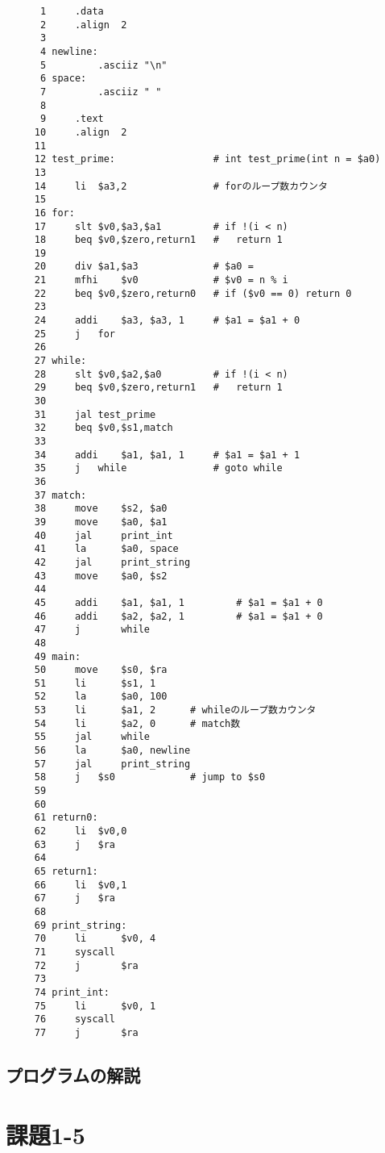 \documentclass[a4j,11pt]{jarticle}
\begin{document}
\begin{verbatim}
      1	    .data
      2	    .align  2
      3	
      4	newline:
      5	        .asciiz "\n"
      6	space:
      7	        .asciiz " "
      8	
      9		.text
     10		.align	2
     11	
     12	test_prime:				    # int test_prime(int n = $a0)
     13	
     14		li	$a3,2			    # forのループ数カウンタ
     15	
     16	for:
     17	    slt	$v0,$a3,$a1	        # if !(i < n)
     18		beq	$v0,$zero,return1	#   return 1
     19	
     20	    div	$a1,$a3			    # $a0 = 
     21		mfhi	$v0			    # $v0 = n % i
     22		beq	$v0,$zero,return0	# if ($v0 == 0) return 0
     23	
     24	    addi	$a3, $a3, 1		# $a1 = $a1 + 0
     25	    j   for
     26	
     27	while:
     28		slt	$v0,$a2,$a0		    # if !(i < n)
     29		beq	$v0,$zero,return1	#   return 1
     30	
     31	    jal test_prime
     32	    beq $v0,$s1,match
     33	
     34	    addi	$a1, $a1, 1		# $a1 = $a1 + 1
     35		j	while			    # goto while
     36	
     37	match: 
     38	    move    $s2, $a0
     39	    move    $a0, $a1
     40	    jal     print_int
     41	    la      $a0, space
     42	    jal     print_string
     43	    move    $a0, $s2
     44	
     45	    addi	$a1, $a1, 1			# $a1 = $a1 + 0
     46	    addi	$a2, $a2, 1			# $a1 = $a1 + 0
     47	    j       while
     48	
     49	main:
     50	    move    $s0, $ra
     51	    li      $s1, 1
     52	    la		$a0, 100 
     53	    li      $a1, 2      # whileのループ数カウンタ
     54	    li      $a2, 0      # match数
     55	    jal     while
     56	    la      $a0, newline
     57	    jal     print_string
     58	    j	$s0				# jump to $s0
     59	
     60	
     61	return0:
     62		li	$v0,0
     63		j	$ra
     64	
     65	return1:
     66		li	$v0,1
     67		j	$ra
     68	
     69	print_string:
     70	    li      $v0, 4
     71	    syscall
     72	    j       $ra
     73	
     74	print_int:
     75	    li      $v0, 1
     76	    syscall
     77	    j       $ra 
\end{verbatim}

\subsection{プログラムの解説}


\section{課題1-5}
\end{document}
